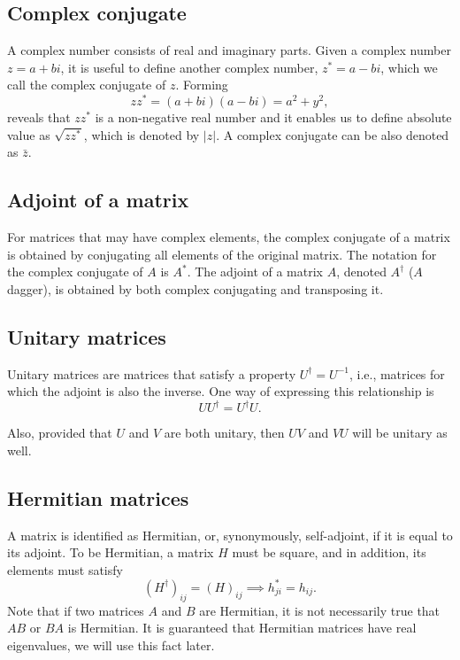 \subsection*{Complex conjugate}
A complex number consists of real and imaginary parts. Given a complex number $z = a + bi$, it is useful to define another complex number, $z^{*} = a - bi$, which we call the complex conjugate of $z$. Forming
$$zz^{*} = (a + bi)(a - bi) = a^2 + y^2,$$ reveals that $zz^{*}$ is a non-negative real number and it enables us to define absolute value as $\sqrt{zz^{*}}$, which is denoted by $\lvert z \rvert$. A complex conjugate can be also denoted as $\bar{z}$.

\subsection*{Adjoint of a matrix}
For matrices that may have complex elements, the complex conjugate of a matrix is obtained by conjugating all elements of the original matrix. The notation for the complex conjugate of $A$ is $A^*$. The adjoint of a matrix $A$, denoted $A^\dag$ ($A$ dagger), is obtained by both complex conjugating and transposing it.

\subsection*{Unitary matrices}
Unitary matrices are matrices that satisfy a property $U^\dag = U^{-1}$, i.e., matrices for which the adjoint is also the inverse. One way of expressing this relationship is 
$$U U^{\dag} = U^{\dag} U.$$

Also, provided that $U$ and $V$ are both unitary, then $UV$ and $VU$ will be unitary as well.

\subsection*{Hermitian matrices}
A matrix is identified as Hermitian, or, synonymously, self-adjoint, if it is equal to its adjoint. To be Hermitian, a matrix $H$ must be square, and in addition, its elements must satisfy $$(H^{\dag})_{ij} = (H)_{ij} \implies h^{*}_{ji} = h_{ij}.$$ Note that if two matrices $A$ and $B$ are Hermitian, it is not necessarily true that $AB$ or $BA$ is Hermitian. It is guaranteed that Hermitian matrices have real eigenvalues, we will use this fact later.

